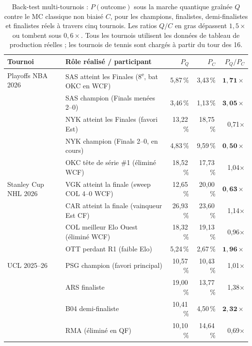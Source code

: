 \documentclass[11pt]{article}
\begin{document}
\begin{table}[!htbp]
\centering
\caption{Back-test multi-tournois : $P(\text{outcome})$ sous la marche
quantique graînée $Q$ contre le MC classique non biaisé $C$, pour les
champions, finalistes, demi-finalistes et finalistes réels à travers
cinq tournois. Les ratios $Q/C$ en gras dépassent $1{,}5\times$ ou
tombent sous $0{,}6\times$. Tous les tournois utilisent les données de
tableau de production réelles ; les tournois de tennis sont chargés à
partir du tour des 16.}
\label{tab:multi_tournament}
\small
\begin{tabular}{llrrr}
\toprule
Tournoi & Rôle réalisé / participant & $P_Q$ & $P_C$ & $P_Q/P_C$ \\
\midrule
Playoffs NBA 2026 & SAS atteint les Finales (8\textsuperscript{e}, bat OKC en WCF) & 5,87\,\% & 3,43\,\% & $\mathbf{1{,}71\times}$ \\
                  & SAS champion (Finals menées 2--0)            & 3,46\,\% & 1,13\,\% & $\mathbf{3{,}05\times}$ \\
                  & NYK atteint les Finales (favori Est)         & 13,22\,\% & 18,75\,\% & 0,71$\times$ \\
                  & NYK champion (Finals 2--0, en cours)         & 4,83\,\% & 9,59\,\% & $\mathbf{0{,}50\times}$ \\
                  & OKC tête de série \#1 (éliminé WCF)          & 18,52\,\% & 17,73\,\% & 1,04$\times$ \\
\midrule
Stanley Cup NHL 2026 & VGK atteint la finale (sweep COL 4--0 WCF) & 12,65\,\% & 20,00\,\% & $\mathbf{0{,}63\times}$ \\
                     & CAR atteint la finale (vainqueur Est CF)   & 26,93\,\% & 23,60\,\% & 1,14$\times$ \\
                     & COL meilleur Elo Ouest (éliminé WCF)       & 18,32\,\% & 19,13\,\% & 0,96$\times$ \\
                     & OTT perdant R1 (faible Elo)                & 5,24\,\% & 2,67\,\% & $\mathbf{1{,}96\times}$ \\
\midrule
UCL 2025--26      & PSG champion (favori principal) & 10,57\,\% & 10,43\,\% & 1,01$\times$ \\
                  & ARS finaliste                    & 19,00\,\% & 13,77\,\% & 1,38$\times$ \\
                  & B04 demi-finaliste               & 10,41\,\% & 4,50\,\% & $\mathbf{2{,}32\times}$ \\
                  & RMA (éliminé en QF)              & 10,10\,\% & 14,64\,\% & 0,69$\times$ \\

\end{tabular}
\end{table}
\end{document}
